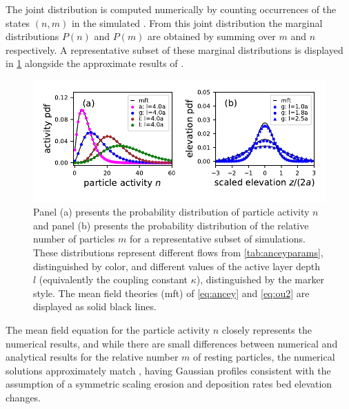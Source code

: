 The joint distribution is computed numerically by counting occurrences of the states $(n,m)$ in the simulated \DIFdelbegin {}\DIFdelend \DIFaddbegin {}\DIFaddend .
From this joint distribution the marginal distributions $P(n)$ and $P(m)$ are obtained by summing over $m$ and $n$ respectively.
A representative subset of these marginal distributions is displayed in \DIFdelbegin {}\DIFdelend \DIFaddbegin {}\DIFaddend \ref{fig:pdfs} alongside the approximate results of \DIFdelbegin {}\DIFdelend \DIFaddbegin {}\DIFaddend .
\begin{figure}[!htbp]
	\includegraphics[width=\linewidth,keepaspectratio]{./figures/ch3/distributions.pdf}
	\caption{Panel (a) presents the probability distribution of particle activity $n$ and panel (b) presents the probability distribution of the relative number of particles $m$ for a representative subset of simulations. These distributions represent different flows from \DIFdelbeginFL {}\DIFdelendFL \DIFaddbeginFL {}\DIFaddendFL \ref{tab:anceyparams}, distinguished by color, and different values of the active layer depth $l$ (equivalently the coupling constant $\kappa$), distinguished by the marker style. The mean field theories (mft) of \DIFdelbeginFL {}\DIFdelendFL \DIFaddbeginFL {}\DIFaddendFL \ref{eq:ancey} \DIFdelbeginFL \DIFdelFL{) }\DIFdelendFL and \DIFdelbeginFL \DIFdelFL{(}\DIFdelendFL \ref{eq:ou2} \DIFdelbeginFL \DIFdelFL{) }\DIFdelendFL are displayed as solid black lines.}
	\label{fig:pdfs}
\end{figure}
The mean field equation \DIFdelbegin \DIFdel{(\ref{eq:ancey} ) }\DIFdelend \DIFaddbegin \DIFadd{\ref{eq:ancey} }\DIFaddend for the particle activity $n$ closely represents the numerical results, and while there are small differences between numerical and analytical results for the relative number $m$ of resting particles, the numerical solutions approximately match \DIFdelbegin {}\DIFdelend \DIFaddbegin {}\DIFaddend , having Gaussian profiles consistent with the assumption of a symmetric scaling \DIFdelbegin {}\DIFdelend \DIFaddbegin {}\DIFaddend erosion and deposition rates \DIFdelbegin {}\DIFdelend \DIFaddbegin {}\DIFaddend bed elevation changes. 


